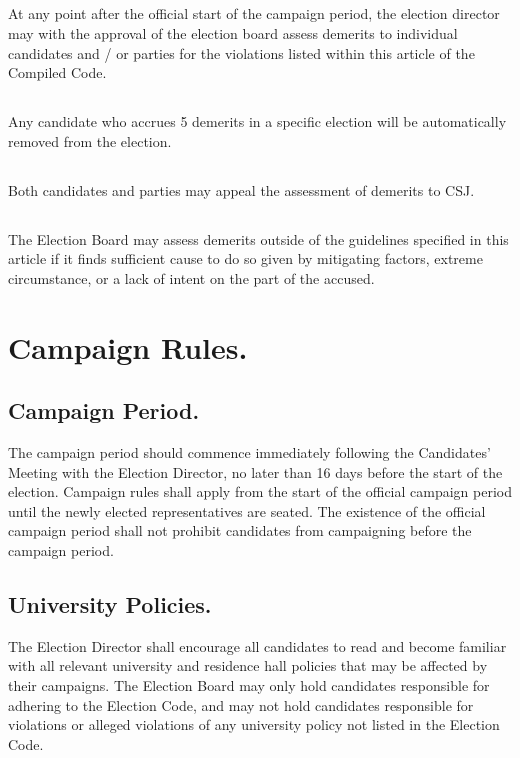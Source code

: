 \subsection{}
At any point after the official start of the campaign period, the election director may with the approval of the election board assess demerits to individual candidates and / or parties for the violations listed within this article of the Compiled Code.

\subsection{}
Any candidate who accrues 5 demerits in a specific election will be automatically removed from the election.

\subsection{}
Both candidates and parties may appeal the assessment of demerits to CSJ.

\subsection{}
The Election Board may assess demerits outside of the guidelines specified in this article if it finds sufficient cause to do so given by mitigating factors, extreme circumstance, or a lack of intent on the part of the accused.


\section{Campaign Rules.}

\subsection{Campaign Period.}
The campaign period should commence immediately following the Candidates' Meeting with the Election Director, no later than 16 days before the start of the election. Campaign rules shall apply from the start of the official campaign period until the newly elected representatives are seated.  The existence of the official campaign period shall not prohibit candidates from campaigning before the campaign period.

\subsection{University Policies.}
The Election Director shall encourage all candidates to read and become familiar with all relevant university and residence hall policies that may be affected by their campaigns.  The Election Board may only hold candidates responsible for adhering to the Election Code, and may not hold candidates responsible for violations or alleged violations of any university policy not listed in the Election Code.

